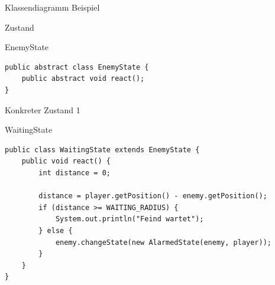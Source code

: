\begin{frame}{Klassendiagramm Beispiel}
\end{frame}

\begin{frame}[fragile]{Zustand}
	\begin{exampleblock}{EnemyState}
     	  \begin{lstlisting}
public abstract class EnemyState {
	public abstract void react();
}     	      
     	  \end{lstlisting}
 	\end{exampleblock}
\end{frame}

\begin{frame}[fragile]{Konkreter Zustand 1}
	\begin{exampleblock}{WaitingState}
 		\begin{lstlisting}
public class WaitingState extends EnemyState {
	public void react() {
		int distance = 0;

		distance = player.getPosition() - enemy.getPosition();
		if (distance >= WAITING_RADIUS) {
			System.out.println("Feind wartet");
		} else {
			enemy.changeState(new AlarmedState(enemy, player));
		}
	}
} 		    
 		\end{lstlisting}
 	\end{exampleblock}
\end{frame}

